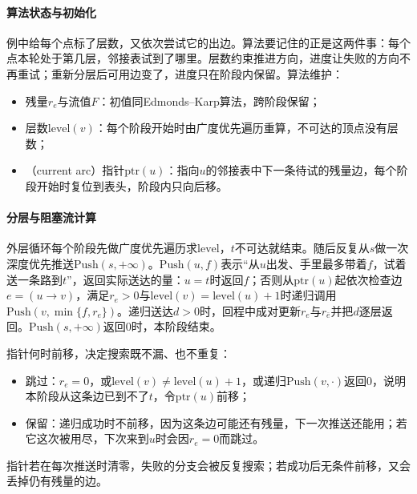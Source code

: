\paragraph{算法状态与初始化}
例中给每个点标了层数，又依次尝试它的出边。算法要记住的正是这两件事：每个点本轮处于第几层，邻接表试到了哪里。层数约束推进方向，进度让失败的方向不再重试；重新分层后可用边变了，进度只在阶段内保留。算法维护：
\begin{itemize}
  \item 残量$r_e$与流值$F$：初值同Edmonds--Karp算法，跨阶段保留；
  \item 层数$\mathrm{level}(v)$：每个阶段开始时由广度优先遍历重算，不可达的顶点没有层数；
  \item {}（current arc）指针$\mathrm{ptr}(u)$：指向$u$的邻接表中下一条待试的残量边，每个阶段开始时复位到表头，阶段内只向后移。
\end{itemize}

\paragraph{分层与阻塞流计算}
外层循环每个阶段先做广度优先遍历求$\mathrm{level}$，$t$不可达就结束。随后反复从$s$做一次深度优先推送$\mathrm{Push}(s,+\infty)$。$\mathrm{Push}(u,f)$表示“从$u$出发、手里最多带着$f$，试着送一条路到$t$”，返回实际送达的量：$u=t$时返回$f$；否则从$\mathrm{ptr}(u)$起依次检查边$e=(u\to v)$，满足$r_e>0$与$\mathrm{level}(v)=\mathrm{level}(u)+1$时递归调用$\mathrm{Push}(v,\min\{f,r_e\})$。递归送达$d>0$时，回程中成对更新$r_e$与$r_{\bar e}$并把$d$逐层返回。$\mathrm{Push}(s,+\infty)$返回$0$时，本阶段结束。

指针何时前移，决定搜索既不漏、也不重复：
\begin{itemize}
  \item 跳过：$r_e=0$，或$\mathrm{level}(v)\neq\mathrm{level}(u)+1$，或递归$\mathrm{Push}(v,\cdot)$返回$0$，说明本阶段从这条边已到不了$t$，令$\mathrm{ptr}(u)$前移；
  \item 保留：递归成功时不前移，因为这条边可能还有残量，下一次推送还能用；若它这次被用尽，下次来到$u$时会因$r_e=0$而跳过。
\end{itemize}
指针若在每次推送时清零，失败的分支会被反复搜索；若成功后无条件前移，又会丢掉仍有残量的边。

